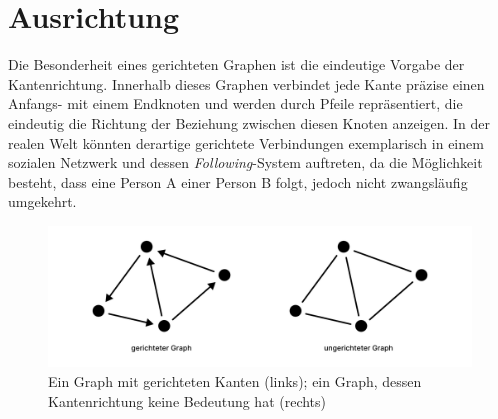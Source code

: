 \section{Ausrichtung}

Die Besonderheit eines gerichteten Graphen ist die eindeutige Vorgabe der Kantenrichtung. Innerhalb dieses Graphen verbindet jede Kante präzise einen Anfangs- mit einem Endknoten und werden durch Pfeile repräsentiert, die eindeutig die Richtung der Beziehung zwischen diesen Knoten anzeigen. In der realen Welt könnten derartige gerichtete Verbindungen exemplarisch in einem sozialen Netzwerk und dessen \emph{Following}-System auftreten, da die Möglichkeit besteht, dass eine Person A einer Person B folgt, jedoch nicht zwangsläufig umgekehrt. \cite{ohlbach2018graphen}

\begin{figure}
    \centering
    \includegraphics[width=1\textwidth]{content/img/Research/Graphen/Ausrichtung.png}
    \caption{Ein Graph mit gerichteten Kanten (links); ein Graph, dessen Kantenrichtung keine Bedeutung hat (rechts)}
    \label{fig:ausrichtung}
\end{figure}
\FloatBarrier